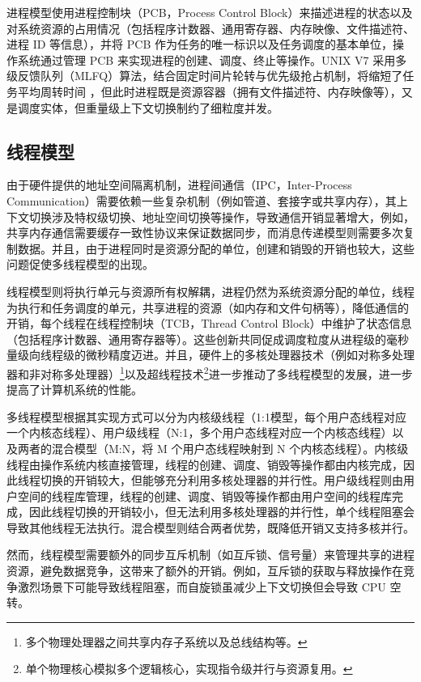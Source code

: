 进程模型使用进程控制块（PCB，Process Control Block）来描述进程的状态以及对系统资源的占用情况（包括程序计数器、通用寄存器、内存映像、文件描述符、进程 ID 等信息），并将 PCB 作为任务的唯一标识以及任务调度的基本单位，操作系统通过管理 PCB 来实现进程的创建、调度、终止等操作。UNIX V7 采用多级反馈队列（MLFQ）算法，结合固定时间片轮转与优先级抢占机制，将缩短了任务平均周转时间 \cite{ritchie1974unix}，但此时进程既是资源容器（拥有文件描述符、内存映像等），又是调度实体，但重量级上下文切换制约了细粒度并发。

\subsection{线程模型}

由于硬件提供的地址空间隔离机制，进程间通信（IPC，Inter-Process Communication）需要依赖一些复杂机制（例如管道、套接字或共享内存），其上下文切换涉及特权级切换、地址空间切换等操作，导致通信开销显著增大，例如，共享内存通信需要缓存一致性协议来保证数据同步，而消息传递模型则需要多次复制数据。并且，由于进程同时是资源分配的单位，创建和销毁的开销也较大，这些问题促使多线程模型的出现。

线程模型则将执行单元与资源所有权解耦，进程仍然为系统资源分配的单位，线程为执行和任务调度的单元，共享进程的资源（如内存和文件句柄等），降低通信的开销，每个线程在线程控制块（TCB，Thread Control Block）中维护了状态信息（包括程序计数器、通用寄存器等）。这些创新共同促成调度粒度从进程级的毫秒量级向线程级的微秒精度迈进。并且，硬件上的多核处理器技术（例如对称多处理器和非对称多处理器）\footnote{多个物理处理器之间共享内存子系统以及总线结构等。}以及超线程技术\footnote{单个物理核心模拟多个逻辑核心，实现指令级并行与资源复用。}进一步推动了多线程模型的发展，进一步提高了计算机系统的性能。

多线程模型根据其实现方式可以分为内核级线程（1:1模型，每个用户态线程对应一个内核态线程）、用户级线程（N:1，多个用户态线程对应一个内核态线程）以及两者的混合模型（M:N，将 M 个用户态线程映射到 N 个内核态线程）。内核级线程由操作系统内核直接管理，线程的创建、调度、销毁等操作都由内核完成，因此线程切换的开销较大，但能够充分利用多核处理器的并行性。用户级线程则由用户空间的线程库管理，线程的创建、调度、销毁等操作都由用户空间的线程库完成，因此线程切换的开销较小，但无法利用多核处理器的并行性，单个线程阻塞会导致其他线程无法执行。混合模型则结合两者优势，既降低开销又支持多核并行。

然而，线程模型需要额外的同步互斥机制（如互斥锁、信号量）来管理共享的进程资源，避免数据竞争，这带来了额外的开销。例如，互斥锁的获取与释放操作在竞争激烈场景下可能导致线程阻塞，而自旋锁虽减少上下文切换但会导致 CPU 空转。

